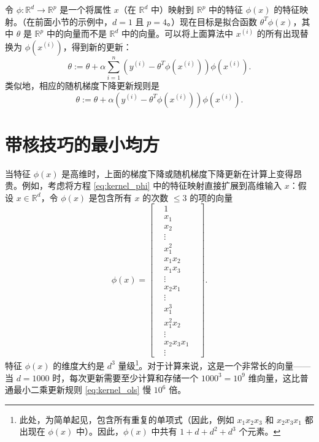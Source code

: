 令 $\phi: \mathbb{R}^d \to \mathbb{R}^p$ 是一个将属性 $x$（在 $\mathbb{R}^d$ 中）映射到 $\mathbb{R}^p$ 中的特征 $\phi(x)$ 的特征映射。（在前面小节的示例中，$d=1$ 且 $p=4$。）现在目标是拟合函数 $\theta^T \phi(x)$，其中 $\theta$ 是 $\mathbb{R}^p$ 中的向量而不是 $\mathbb{R}^d$ 中的向量。可以将上面算法中 $x^{(i)}$ 的所有出现替换为 $\phi(x^{(i)})$，得到新的更新：
\begin{equation}
    \theta := \theta + \alpha \sum_{i=1}^n (y^{(i)} - \theta^T \phi(x^{(i)})) \phi(x^{(i)}).
    \label{eq:kernel_iterate}
\end{equation}
类似地，相应的随机梯度下降更新规则是
\begin{equation}
    \theta := \theta + \alpha (y^{(i)} - \theta^T \phi(x^{(i)})) \phi(x^{(i)}).
\end{equation}

\section{带核技巧的最小均方}

当特征 $\phi(x)$ 是高维时，上面的梯度下降或随机梯度下降更新在计算上变得昂贵。例如，考虑将方程 \eqref{eq:kernel_phi} 中的特征映射直接扩展到高维输入 $x$：假设 $x \in \mathbb{R}^d$，令 $\phi(x)$ 是包含所有 $x$ 的次数 $\le 3$ 的项的向量
\begin{equation}
    \phi(x) = \begin{bmatrix} &1& \\ &x_1& \\ &x_2& \\ &\vdots& \\ &x_1^2& \\ &x_1 x_2& \\ &x_1 x_3& \\ &\vdots& \\ &x_2 x_1& \\ &\vdots& \\ &x_1^3& \\ &x_1^2 x_2& \\ &\vdots& \\ &x_2 x_3 x_1& \\ &\vdots& \end{bmatrix}. \label{eq:5.5}
\end{equation}
特征 $\phi(x)$ 的维度大约是 $d^3$ 量级\footnote{此处，为简单起见，包含所有重复的单项式（因此，例如 $x_1 x_2 x_3$ 和 $x_2 x_3 x_1$ 都出现在 $\phi(x)$ 中）。因此，$\phi(x)$ 中共有 $1 + d + d^2 + d^3$ 个元素。}。对于计算来说，这是一个非常长的向量——当 $d = 1000$ 时，每次更新需要至少计算和存储一个 $1000^3 = 10^9$ 维向量，这比普通最小二乘更新规则 \eqref{eq:kernel_ols} 慢 $10^6$ 倍。

